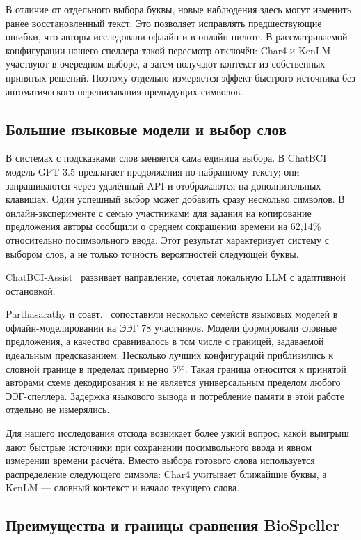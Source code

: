 \documentclass[11pt,a4paper]{article}
\begin{document}
В отличие от отдельного выбора буквы,
новые наблюдения здесь могут изменить ранее
восстановленный текст. Это позволяет исправлять
предшествующие ошибки, что авторы исследовали
офлайн и в онлайн-пилоте. В рассматриваемой
конфигурации нашего спеллера такой пересмотр отключён:
Char4 и KenLM участвуют в очередном выборе,
а затем получают контекст из собственных принятых
решений. Поэтому отдельно измеряется эффект
быстрого источника без автоматического
переписывания предыдущих символов.

\subsection{Большие языковые модели и выбор слов}

В системах с подсказками слов меняется сама единица
выбора. В ChatBCI~\citep{p41698950}
модель GPT-3.5 предлагает продолжения по набранному
тексту; они запрашиваются через удалённый API
и отображаются на дополнительных клавишах.
Один успешный выбор может добавить сразу несколько
символов. В онлайн-эксперименте с семью участниками
для задания на копирование предложения авторы
сообщили о среднем сокращении времени на 62,14\%
относительно посимвольного ввода.
Этот результат характеризует систему с выбором слов,
а не только точность вероятностей следующей буквы.

ChatBCI-Assist~\citep{p42139128}
развивает направление, сочетая локальную LLM
с адаптивной остановкой. 

Parthasarathy и соавт.~\citep{p42821610}
сопоставили несколько семейств языковых моделей
в офлайн-моделировании на ЭЭГ 78 участников.
Модели формировали словные предложения,
а качество сравнивалось в том числе с границей,
задаваемой идеальным предсказанием.
Несколько лучших конфигураций приблизились
к словной границе в пределах примерно 5\%.
Такая граница относится к принятой авторами
схеме декодирования и не является универсальным
пределом любого ЭЭГ-спеллера.
Задержка языкового вывода и потребление памяти
в этой работе отдельно не измерялись.

Для нашего исследования отсюда возникает
более узкий вопрос: какой выигрыш дают быстрые
источники при сохранении посимвольного ввода
и явном измерении времени расчёта.
Вместо выбора готового слова используется
распределение следующего символа:
Char4 учитывает ближайшие буквы,
а KenLM --- словный контекст и начало текущего слова.

\subsection{Преимущества и границы сравнения BioSpeller}
\end{document}
